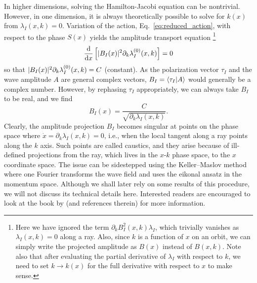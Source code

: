 In higher dimensions, solving the Hamilton-Jacobi equation can be nontrivial.
However, in one dimension, it is always theoretically possible to solve for $k(x)$ from $\lambda_{I}(x, k) = 0$.
Variation of the action, Eq.~\eqref{eq:reduced_action}, with respect to the phase $S(x)$ yields the amplitude transport equation%
\footnote{Here we have ignored the term $\partial_{k}{B_{I}^{2}(x,k)}\lambda_{I}$, which trivially vanishes as $\lambda_{I}(x, k) = 0$ along a ray.
Also, since $k$ is a function of $x$ on an orbit, we can simply write the projected amplitude as $B(x)$ instead of $B(x,k)$.
Note also that after evaluating the partial derivative of $\lambda_{I}$ with respect to $k$, we need to set $k \to k(x)$ for the full derivative with respect to $x$ to make sense.}
%
\begin{equation}
\frac{\mathrm{d}}{\mathrm{d}{x}}\left[\lvert B_{I}(x)\rvert^{2}\partial_{k}\lambda^{(0)}_{I}(x, k)\right] = 0
\end{equation}
%
so that
$\lvert B_{I}(x)\rvert^{2}\partial_{k}\lambda^{(0)}_{I}(x, k) = C$ (constant).
As the polarization vector $\tau_{I}$ and the wave amplitude $A$ are general complex vectors, $B_{I}=\mathinner{\langle{\tau_{I}|A}\rangle}$ would generally be a complex number.
However, by rephasing $\tau_{I}$ appropriately, we can always take $B_{I}$ to be
real, and we find
%
\begin{equation}
  B_{I}(x) = \frac{C}{\sqrt{\partial_{k}\lambda_{I}(x, k)}}.
\end{equation}
%
Clearly, the amplitude projection $B_{I}$ becomes singular at points on the phase space where $\dot{x} = \partial_{k}\lambda_{I}(x, k) = 0$, i.e., when the local tangent along a ray points along the $k$ axis.
Such points are called caustics, and they arise because of ill-defined projections from the ray, which lives in the $x$-$k$ phase space, to the $x$ coordinate space.
The issue can be sidestepped using the Keller--Maslov method~\cite{keller1958,maslov1981} where one Fourier transforms the wave field and uses the eikonal ansatz in the momentum space.
Although we shall later rely on some results of this procedure, we will not discuss its technical details here.
Interested readers are encouraged to look at the book by \citet[Chapter 6]{tracy2014} (and references therein) for more information.

